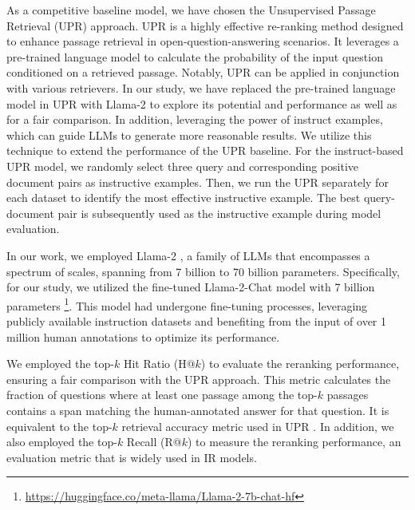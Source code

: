 \documentclass[sigconf,natbib=true,anonymous=false]{acmart}
\begin{document}
As a competitive baseline model, we have chosen the Unsupervised Passage Retrieval (UPR) approach. UPR is a highly effective re-ranking method designed to enhance passage retrieval in open-question-answering scenarios. It leverages a pre-trained language model to calculate the probability of the input question conditioned on a retrieved passage. Notably, UPR can be applied in conjunction with various retrievers. In our study, we have replaced the pre-trained language model in UPR with Llama-2 to explore its potential and performance as well as for a fair comparison. In addition, leveraging the power of instruct examples, which can guide LLMs to generate more reasonable results. We utilize this technique to extend the performance of the UPR baseline. For the instruct-based UPR model, we randomly select three query and corresponding positive document pairs as instructive examples. Then, we run the UPR separately for each dataset to identify the most effective instructive example. The best query-document pair is subsequently used as the instructive example during model evaluation.

In our work, we employed Llama-2 \cite{DBLP:journals/corr/abs-2307-09288}, a family of LLMs that encompasses a spectrum of scales, spanning from 7 billion to 70 billion parameters. Specifically, for our study, we utilized the fine-tuned Llama-2-Chat model with 7 billion parameters \footnote{\url{https://huggingface.co/meta-llama/Llama-2-7b-chat-hf}}. This model had undergone fine-tuning processes, leveraging publicly available instruction datasets and benefiting from the input of over 1 million human annotations to optimize its performance.


We employed the top-$k$ Hit Ratio (H@$k$) to evaluate the reranking performance, ensuring a fair comparison with the UPR approach. This metric calculates the fraction of questions where at least one passage among the top-$k$ passages contains a span matching the human-annotated answer for that question. It is equivalent to the top-$k$ retrieval accuracy metric used in UPR \cite{DBLP:journals/tmlr/IzacardCHRBJG22}. In addition, we also employed the top-$k$ Recall (R@$k$) to measure the reranking performance, an evaluation metric that is widely used in IR models.
\end{document}
